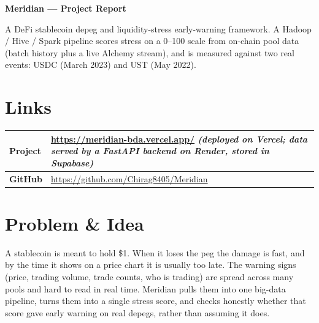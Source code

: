 \documentclass[11pt,a4paper]{article}
\let\oldsection\section
\renewcommand\section{\needspace{9\baselineskip}\oldsection}
\begin{document}
\pagestyle{plain}

{\fontsize{26}{30}\selectfont\bfseries Meridian --- Project Report\par}
\vspace{6pt}

\begin{tcolorbox}[enhanced,colback=blue!4,colframe=blue!4,boxrule=0pt,
  borderline west={3pt}{0pt}{blue!60},left=10pt,top=6pt,bottom=6pt,sharp corners]
A DeFi stablecoin depeg and liquidity-stress early-warning framework.
A Hadoop / Hive / Spark pipeline scores stress on a 0--100 scale from on-chain
pool data (batch history plus a live Alchemy stream), and is measured against
two real events: USDC (March 2023) and UST (May 2022).
\end{tcolorbox}

\section*{Links}
\begin{tabularx}{\linewidth}{@{}>{\bfseries}p{2.2cm}X@{}}
\toprule
Project & \url{https://meridian-bda.vercel.app/} \emph{(deployed on Vercel; data served by a FastAPI backend on Render, stored in Supabase)}\\
\midrule
GitHub & \url{https://github.com/Chirag8405/Meridian}\\
\bottomrule
\end{tabularx}

\section*{Problem \& Idea}
A stablecoin is meant to hold \$1. When it loses the peg the damage is fast,
and by the time it shows on a price chart it is usually too late. The warning
signs (price, trading volume, trade counts, who is trading) are spread across
many pools and hard to read in real time. Meridian pulls them into one
big-data pipeline, turns them into a single stress score, and checks honestly
whether that score gave early warning on real depegs, rather than assuming it
does.
\end{document}
